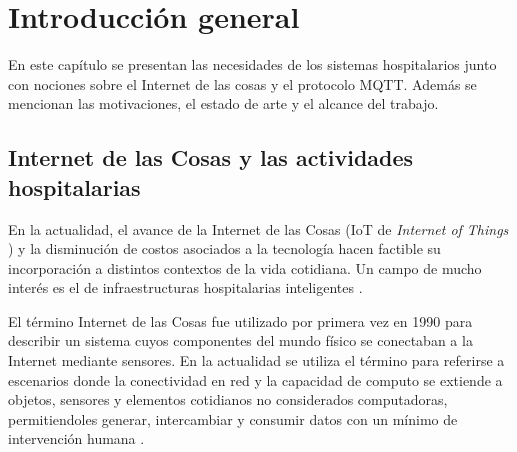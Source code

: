 
\chapter{Introducción general} %

\label{Chapter1} %
\label{IntroGeneral}
En este capítulo se presentan las necesidades de los sistemas hospitalarios junto con nociones sobre el Internet de las cosas y el protocolo MQTT. Además se mencionan las motivaciones, el estado de arte y el alcance del trabajo.

\newcommand{\keyword}[1]{\textbf{#1}}
\newcommand{\tabhead}[1]{\textbf{#1}}
\newcommand{\code}[1]{\texttt{#1}}
\newcommand{\file}[1]{\texttt{\bfseries#1}}
\newcommand{\option}[1]{\texttt{\itshape#1}}
\newcommand{\grados}{$^{\circ}$}



\section{Internet de las Cosas y las actividades hospitalarias}
\label{sec:Internet de las Cosas y las actividades hospitalarias}

En la actualidad, el avance de la Internet de las Cosas (IoT de \textit{Internet of Things} ) y la disminución de costos asociados a la tecnología hacen factible su incorporación a distintos contextos de la vida cotidiana. Un campo de mucho interés es el de infraestructuras hospitalarias inteligentes \citep{ARTICLE:1}.

El término Internet de las Cosas fue utilizado por primera vez en 1990 para describir un sistema cuyos componentes del mundo físico se conectaban a la Internet mediante sensores. En la actualidad se utiliza el término para referirse a escenarios donde la conectividad en red y la capacidad de computo se extiende a objetos, sensores y elementos cotidianos no considerados computadoras, permitiendoles generar, intercambiar y consumir datos con un mínimo de intervención humana \citep{ARTICLE:3}.

